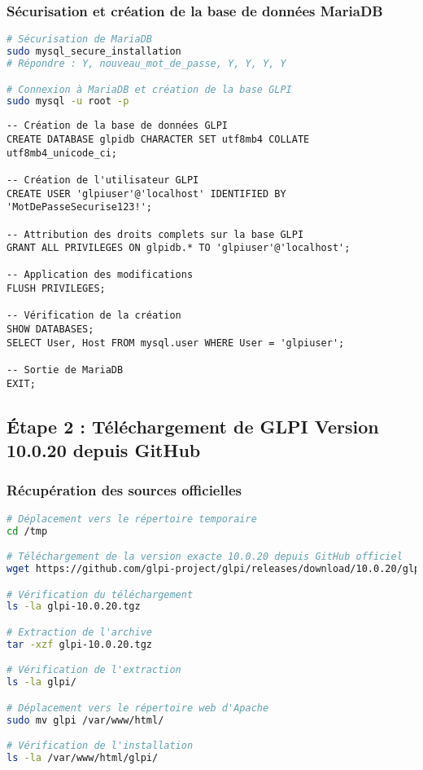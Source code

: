 \documentclass[12pt,a4paper]{article}
\begin{document}
\subsubsection{Sécurisation et création de la base de données MariaDB}
\begin{lstlisting}[language=bash, caption=Configuration MariaDB pour GLPI]
# Sécurisation de MariaDB
sudo mysql_secure_installation
# Répondre : Y, nouveau_mot_de_passe, Y, Y, Y, Y

# Connexion à MariaDB et création de la base GLPI
sudo mysql -u root -p
\end{lstlisting}

\begin{lstlisting}[caption=Commandes SQL pour GLPI]
-- Création de la base de données GLPI
CREATE DATABASE glpidb CHARACTER SET utf8mb4 COLLATE utf8mb4_unicode_ci;

-- Création de l'utilisateur GLPI
CREATE USER 'glpiuser'@'localhost' IDENTIFIED BY 'MotDePasseSecurise123!';

-- Attribution des droits complets sur la base GLPI
GRANT ALL PRIVILEGES ON glpidb.* TO 'glpiuser'@'localhost';

-- Application des modifications
FLUSH PRIVILEGES;

-- Vérification de la création
SHOW DATABASES;
SELECT User, Host FROM mysql.user WHERE User = 'glpiuser';

-- Sortie de MariaDB
EXIT;
\end{lstlisting}

\subsection{Étape 2 : Téléchargement de GLPI Version 10.0.20 depuis GitHub}

\subsubsection{Récupération des sources officielles}
\begin{lstlisting}[language=bash, caption=Téléchargement GLPI 10.0.20]
# Déplacement vers le répertoire temporaire
cd /tmp

# Téléchargement de la version exacte 10.0.20 depuis GitHub officiel
wget https://github.com/glpi-project/glpi/releases/download/10.0.20/glpi-10.0.20.tgz

# Vérification du téléchargement
ls -la glpi-10.0.20.tgz

# Extraction de l'archive
tar -xzf glpi-10.0.20.tgz

# Vérification de l'extraction
ls -la glpi/

# Déplacement vers le répertoire web d'Apache
sudo mv glpi /var/www/html/

# Vérification de l'installation
ls -la /var/www/html/glpi/
\end{lstlisting}
\end{document}
